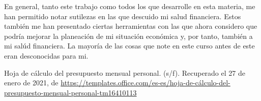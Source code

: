\documentclass[11pt]{article}
\begin{document}
	\par En general, tanto este trabajo como todos los que desarrolle en esta materia, me han permitido notar sutilezas en las que descuido mi salud financiera. Estos también me han presentado ciertas herramientas con las que ahora considero que podría mejorar la planeación de mi situación económica y, por tanto, también a mi salúd financiera. La mayoría de las cosas que note en este curso antes de este eran desconocidas para mi.

\newpage
	\begin{thebibliography}{X}
	
		 Hoja de cálculo del presupuesto mensual personal. (s/f). Recuperado el 27 de enero de 2021, de \url{https://templates.office.com/es-es/hoja-de-cálculo-del-presupuesto-mensual-personal-tm16410113}
		
	\end{thebibliography}
\end{document}
